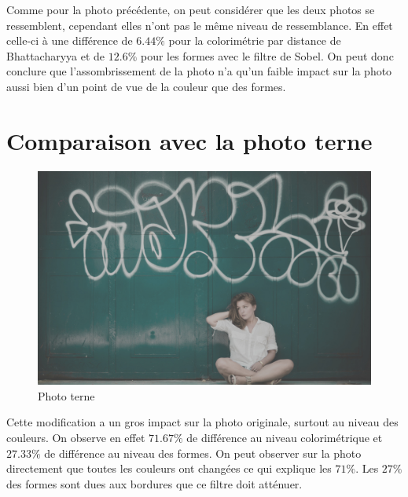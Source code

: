 \documentclass[]{article}
\begin{document}
Comme pour la photo précédente, on peut considérer que les deux photos
se ressemblent, cependant elles n'ont pas le même niveau de
ressemblance. En effet celle-ci à une différence de $6.44\%$ pour la
colorimétrie par distance de Bhattacharyya et de $12.6\%$ pour les
formes avec le filtre de Sobel. On peut donc conclure que
l'assombrissement de la photo n'a qu'un faible impact sur la photo aussi
bien d'un point de vue de la couleur que des formes.

\newpage

\section{Comparaison avec la photo
terne}\label{comparaison-avec-la-photo-terne}

\begin{figure}[htbp]
\centering
\includegraphics{photos/terne.jpg}
\caption{Photo terne}
\end{figure}

Cette modification a un gros impact sur la photo originale, surtout au
niveau des couleurs. On observe en effet $71.67\%$ de différence au
niveau colorimétrique et $27.33\%$ de différence au niveau des formes.
On peut observer sur la photo directement que toutes les couleurs ont
changées ce qui explique les $71\%$. Les $27\%$ des formes sont dues aux
bordures que ce filtre doit atténuer.
\end{document}
